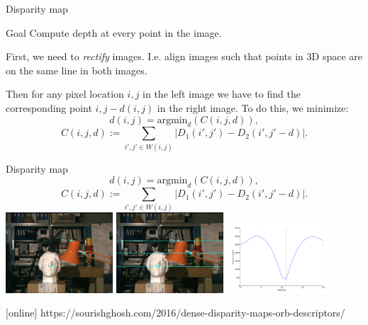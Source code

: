\documentclass[aspectratio=169]{beamer}
\begin{document}
\begin{frame}{Disparity map}
    \begin{block}{Goal}
        Compute depth at every point in the image.
    \end{block}
    First, we need to \emph{rectify} images. I.e. align images such that points in 3D space are on the same line in both images.
    
    Then for any pixel location $i,j$ in the left image we have to find the corresponding point $i, j-d(i,j)$ in the right image. To do this, we minimize:
    \[ d(i,j) = \textrm{argmin}_d(C(i,j,d)),\]
    \[ C(i,j,d) := \sum_{i',j' \in W(i,j)} \left| D_1(i',j') - D_2(i', j'-d) \right|.\]

\end{frame}
\begin{frame}{Disparity map}
    \[ d(i,j) = \textrm{argmin}_d(C(i,j,d)),\]
    \[ C(i,j,d) := \sum_{i',j' \in W(i,j)} \left| D_1(i',j') - D_2(i', j'-d) \right|.\]
    \centering
    \includegraphics[width=0.3\textwidth]{images/epi-left.png}
    \includegraphics[width=0.3\textwidth]{images/epi-right.png}
    \includegraphics[width=0.3\textwidth]{images/epipolar_cost.png}

    \begin{thebibliography}{9}
[online]
 https://sourishghosh.com/2016/dense-disparity-maps-orb-descriptors/
\end{thebibliography}
\end{frame}
\end{document}

